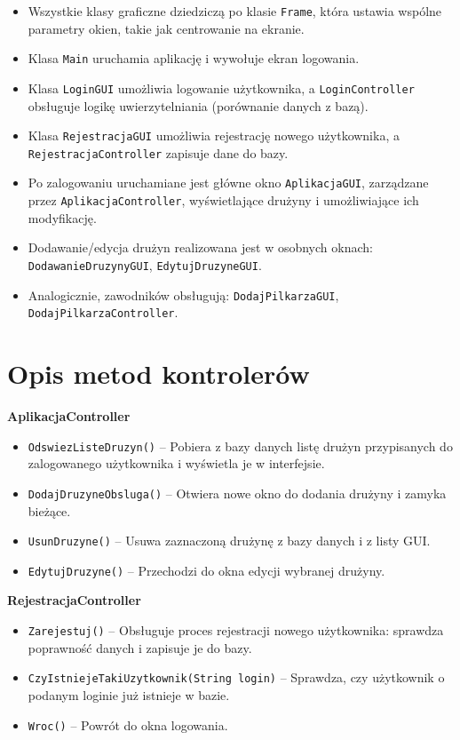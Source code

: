 \documentclass{urdpl}     %
\begin{document}
\begin{itemize}
  \item Wszystkie klasy graficzne dziedziczą po klasie \texttt{Frame}, która ustawia wspólne parametry okien, takie jak centrowanie na ekranie.
  \item Klasa \texttt{Main} uruchamia aplikację i wywołuje ekran logowania.
  \item Klasa \texttt{LoginGUI} umożliwia logowanie użytkownika, a \texttt{LoginController} obsługuje logikę uwierzytelniania (porównanie danych z bazą).
  \item Klasa \texttt{RejestracjaGUI} umożliwia rejestrację nowego użytkownika, a \texttt{RejestracjaController} zapisuje dane do bazy.
  \item Po zalogowaniu uruchamiane jest główne okno \texttt{AplikacjaGUI}, zarządzane przez \texttt{AplikacjaController}, wyświetlające drużyny i umożliwiające ich modyfikację.
  \item Dodawanie/edycja drużyn realizowana jest w osobnych oknach: \texttt{DodawanieDruzynyGUI}, \texttt{EdytujDruzyneGUI}.
  \item Analogicznie, zawodników obsługują: \texttt{DodajPilkarzaGUI}, \texttt{DodajPilkarzaController}.

\end{itemize}

\section{Opis metod kontrolerów}

\textbf{AplikacjaController}
\begin{itemize}
  \item \texttt{OdswiezListeDruzyn()} – Pobiera z bazy danych listę drużyn przypisanych do zalogowanego użytkownika i wyświetla je w interfejsie.
  \item \texttt{DodajDruzyneObsluga()} – Otwiera nowe okno do dodania drużyny i zamyka bieżące.
  \item \texttt{UsunDruzyne()} – Usuwa zaznaczoną drużynę z bazy danych i z listy GUI.
  \item \texttt{EdytujDruzyne()} – Przechodzi do okna edycji wybranej drużyny.
\end{itemize}

\textbf{RejestracjaController}
\begin{itemize}
  \item \texttt{Zarejestuj()} – Obsługuje proces rejestracji nowego użytkownika: sprawdza poprawność danych i zapisuje je do bazy.
  \item \texttt{CzyIstniejeTakiUzytkownik(String login)} – Sprawdza, czy użytkownik o podanym loginie już istnieje w bazie.
  \item \texttt{Wroc()} – Powrót do okna logowania.
\end{itemize}
\end{document}
